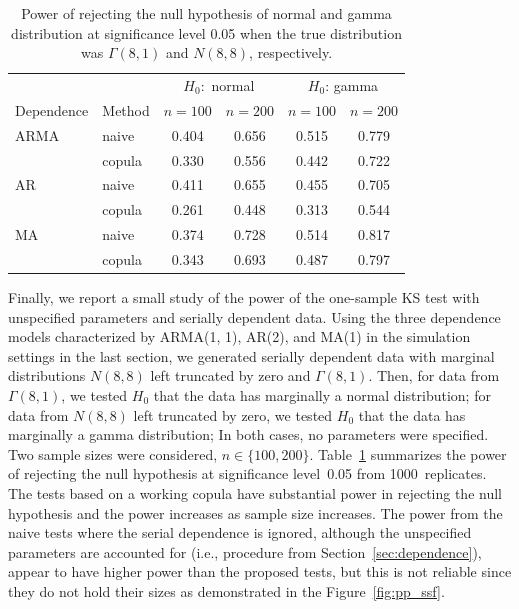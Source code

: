 \documentclass[12pt, letterpaper, titlepage]{article}
\begin{document}
\begin{table}[tbp]
  \label{tab:power}
  \caption{Power of rejecting the null hypothesis of normal and gamma
    distribution at significance level 0.05 when the true distribution was
    $\Gamma(8, 1)$ and $N(8, 8)$, respectively. }
\centering
\begin{tabular}{ll cccc}
  \toprule
  &  & \multicolumn{2}{c}{$H_0:$ normal} &
  \multicolumn{2}{c}{$H_0$: gamma}\\
  \cmidrule(lr){3-4}\cmidrule(lr){5-6}
  Dependence & Method & $n = 100$ & $n = 200$ & $n = 100$ & $n = 200$\\
  \midrule
ARMA & naive & 0.404 & 0.656 & 0.515 & 0.779 \\ 
 & copula & 0.330 & 0.556 & 0.442 & 0.722 \\ 
AR & naive & 0.411 & 0.655 & 0.455 & 0.705 \\ 
& copula & 0.261 & 0.448 & 0.313 & 0.544 \\ 
MA & naive & 0.374 & 0.728 & 0.514 & 0.817 \\ 
& copula & 0.343 & 0.693 & 0.487 & 0.797 \\ 
   \bottomrule
\end{tabular}
\end{table}

Finally, we report a small study of the power of the one-sample KS test with
unspecified parameters and serially dependent data. Using the three dependence
models characterized by ARMA(1, 1), AR(2), and MA(1) in the simulation settings
in the last section, we generated serially
dependent data with marginal distributions $N(8, 8)$ left truncated by zero and
$\Gamma(8, 1)$. 
Then, for data from $\Gamma(8, 1)$, we tested $H_0$ that the
data has marginally a normal distribution; for data from $N(8, 8)$ left
truncated by zero, we tested $H_0$ that the data has marginally a gamma
distribution;  In both cases, no parameters were specified. Two sample sizes
were considered, $n \in \{100, 200\}$. Table~\ref{tab:power} summarizes the
power of rejecting the null hypothesis at significance level~0.05 from
1000~replicates. The tests
based on a working copula have substantial power in rejecting the null
hypothesis and the power increases as sample size increases. The power from the
naive tests where the serial dependence is ignored, although the unspecified
parameters are accounted for (i.e., procedure from 
Section~\ref{sec:dependence}), appear to 
have higher power than the proposed tests, but this is not reliable since they 
do not hold their sizes as demonstrated in the Figure~\ref{fig:pp_ssf}.
\end{document}
